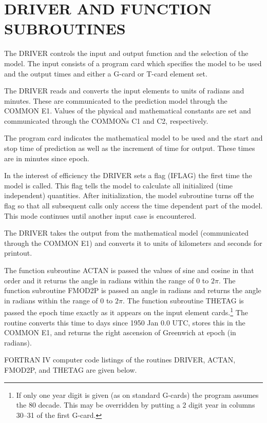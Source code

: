 \section[Driver and Function Subroutines]{DRIVER AND FUNCTION SUBROUTINES}
The DRIVER controls the input and output function and the selection of the
model.  The input consists of a program card which specifies the model to be
used and the output times and either a G-card or T-card element set.

The DRIVER reads and converts the input elements to units of radians and
minutes.  These are communicated to the prediction model through the COMMON
E1.  Values of the physical and mathematical constants are set and
communicated through the COMMONs C1 and C2, respectively.

The program card indicates the mathematical model to be used and the start and
stop time of prediction as well as the increment of time for output.  These
times are in minutes since epoch.

In the interest of efficiency the DRIVER sets a flag (IFLAG) the first time
the model is called.  This flag tells the model to calculate all initialized
(time independent) quantities.  After initialization, the model subroutine
turns off the flag so that all subsequent calls only access the time dependent
part of the model.  This mode continues until another input case is
encountered.

The DRIVER takes the output from the mathematical model (communicated through
the COMMON E1) and converts it to units of kilometers and seconds for
printout.

The function subroutine ACTAN is passed the values of sine and cosine in that
order and it returns the angle in radians within the range of 0 to $2\pi$.
The function subroutine FMOD2P is passed an angle in radians and returns the
angle in radians within the range of 0 to $2\pi$.  The function subroutine
THETAG is passed the epoch time exactly as it appears on the input element
cards.\footnote[1]{If only one year digit is given (as on standard G-cards) the
program assumes the 80 decade.  This may be overridden by putting a 2 digit
year in columns 30--31 of the first G-card.}  The routine converts this time
to days since 1950 Jan 0.0 UTC, stores this in the COMMON E1, and returns the
right ascension of Greenwich at epoch (in radians).

FORTRAN IV computer code listings of the routines DRIVER, ACTAN, FMOD2P,
and THETAG are given below.
\newpage

\newpage

\newpage

\newpage

\newpage
